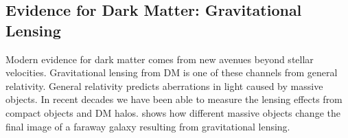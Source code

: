 \subsection{Evidence for Dark Matter: Gravitational Lensing\label{sec:ev4dm_lens}}

Modern evidence for dark matter comes from new avenues beyond stellar velocities.
Gravitational lensing from DM is one of these channels from general relativity.
General relativity predicts aberrations in light caused by massive objects.
In recent decades we have been able to measure the lensing effects from compact objects and DM halos.
 shows how different massive objects change the final image of a faraway galaxy resulting from gravitational lensing.

